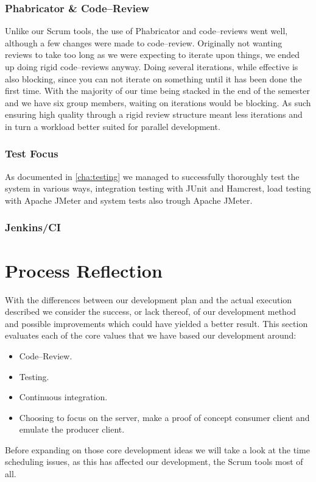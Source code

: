 \subsubsection{Phabricator \& Code--Review}
Unlike our Scrum tools, the use of Phabricator and code--reviews went well, although a few changes were made to code--review.
Originally not wanting reviews to take too long as we were expecting to iterate upon things, we ended up doing rigid code--reviews anyway.
Doing several iterations, while effective is also blocking, since you can not iterate on something until it has been done the first time.
With the majority of our time being stacked in the end of the semester and we have six group members, waiting on iterations would be blocking.
As such ensuring high quality through a rigid review structure meant less iterations and in turn a workload better suited for parallel development.
\subsubsection{Test Focus}
As documented in \cref{cha:testing} we managed to successfully thoroughly test the system in various ways, integration testing with JUnit and Hamcrest, load testing with Apache JMeter and system tests also trough Apache JMeter.
\subsubsection{Jenkins/CI}
\section{Process Reflection}
With the differences between our development plan and the actual execution described we consider the success, or lack thereof, of our development method and possible improvements which could have yielded a better result.
This section evaluates each of the core values that we have based our development around:
\begin{itemize}
    \item Code--Review.
    \item Testing.
    \item Continuous integration.
    \item Choosing to focus on the server, make a proof of concept consumer client and emulate the producer client.
\end{itemize}
Before expanding on those core development ideas we will take a look at the time scheduling issues, as this has affected our development, the Scrum tools most of all.
